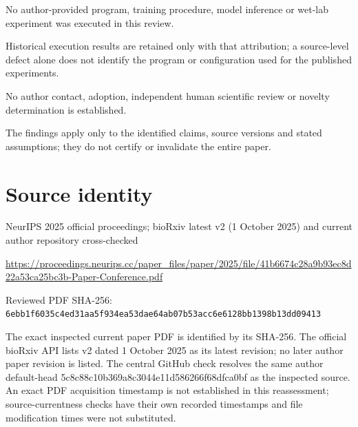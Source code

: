 \documentclass[11pt]{article}
\begin{document}
No author-provided program, training procedure, model inference or wet-lab experiment was executed in this review.\par

Historical execution results are retained only with that attribution; a source-level defect alone does not identify the program or configuration used for the published experiments.\par

No author contact, adoption, independent human scientific review or novelty determination is established.\par

The findings apply only to the identified claims, source versions and stated assumptions; they do not certify or invalidate the entire paper.\par

\section*{Source identity}

NeurIPS 2025 official proceedings; bioRxiv latest v2 (1 October 2025) and current author repository cross-checked

\url{https://proceedings.neurips.cc/paper_files/paper/2025/file/41b6674c28a9b93ec8d22a53ca25bc3b-Paper-Conference.pdf}

Reviewed PDF SHA-256: \nolinkurl{6ebb1f6035c4ed31aa5f934ea53dae64ab07b53acc6e6128bb1398b13dd09413}

The exact inspected current paper PDF is identified by its SHA-256. The official bioRxiv API lists v2 dated 1 October 2025 as its latest revision; no later author paper revision is listed. The central GitHub check resolves the same author default-head 5c8c88c10b369a8c3044e11d586266f68dfca0bf as the inspected source. An exact PDF acquisition timestamp is not established in this reassessment; source-currentness checks have their own recorded timestamps and file modification times were not substituted.
\end{document}
